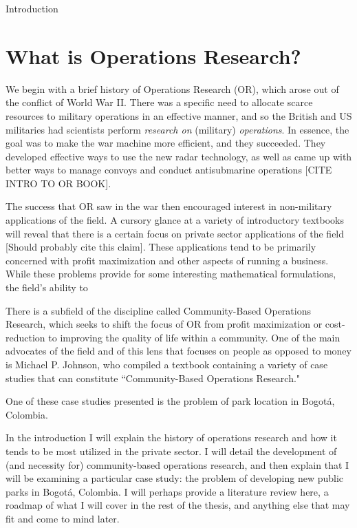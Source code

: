 \documentclass[12pt]{pom_thesis}
\begin{document}
\begin{chapter}{Introduction}
\label{Intro}
\section{What is Operations Research?}

	We begin with a brief history of Operations Research (OR), which arose out of the conflict of World War II. There was a specific need to allocate scarce resources to military operations in an effective manner, and so the British and US militaries had scientists perform \textit{research on} (military) \textit{operations}. In essence, the goal was to make the war machine more efficient, and they succeeded. They developed effective ways to use the new radar technology, as well as came up with better ways to manage convoys and conduct antisubmarine operations [CITE INTRO TO OR BOOK]. 
	
	The success that OR saw in the war then encouraged interest in non-military applications of the field.
	A cursory glance at a variety of introductory textbooks will reveal that there is a certain focus on private sector applications of the field [Should probably cite this claim]. These applications tend to be primarily concerned with profit maximization and other aspects of running a business. While these problems provide for some interesting mathematical formulations, the field's ability to 
	
	There is a subfield of the discipline called Community-Based Operations Research, which seeks to shift the focus of OR from profit maximization or cost-reduction to improving the quality of life within a community. One of the main advocates of the field and of this lens that focuses on people as opposed to money is Michael P. Johnson, who compiled a textbook containing a variety of case studies that can constitute ``Community-Based Operations Research." 
	
	One of these case studies presented is the problem of park location in Bogot\'{a}, Colombia.

In the introduction I will explain the history of operations research and how it tends to be most utilized in the private sector. I will detail the development of (and necessity for) community-based operations research, and then explain that I will be examining a particular case study: the problem of developing new public parks in Bogot\'a, Colombia. I will perhaps provide a literature review here, a roadmap of what I will cover in the rest of the thesis, and anything else that may fit and come to mind later.


\end{chapter}
\end{document}
